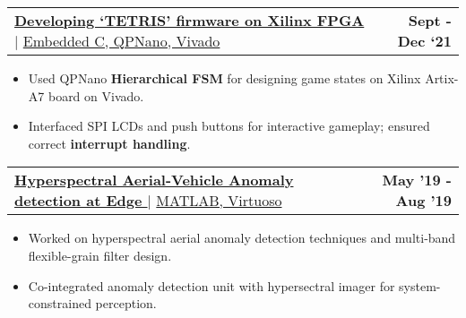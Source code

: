 \documentclass[letterpaper,11pt]{article}
\makeatletter
\newcommand{\resumeItem}[1]{
  \item\small{
    {#1 \vspace{-2pt}}
  }
}
\newcommand{\resumeProjectHeading}[2]{
    \item
    \begin{tabular*}{1\textwidth}{l@{\extracolsep{\fill}}r}
      \small#1 & \textbf{\small #2}\\
    \end{tabular*}\vspace{2pt}
}
\newcommand{\resumeItemListStart}{\begin{itemize}}
\newcommand{\resumeItemListEnd}{\end{itemize}\vspace{-5pt}}
\makeatother
\begin{document}
            


          
      \resumeProjectHeading
          {\href{https://github.com/umang-garg21/TETRIS-on-FPGA}{\textbf{\normalsize{Developing `TETRIS' firmware on Xilinx FPGA}} \href{https://github.com/UMANG-GARG-UCSB/TETRIS-on-FPGA}{\raisebox{-0.1\height}\faExternalLink }} $|$ {\underline{Embedded C, QPNano, Vivado}}}{Sept - Dec `21}
          \resumeItemListStart
               \vspace{-2pt}
            \resumeItem{\normalsize{Used QPNano \textbf{Hierarchical FSM} for designing game states on Xilinx Artix-A7 board on Vivado.}}
            
            \vspace{2pt}
            
            \resumeItem{\normalsize{Interfaced SPI LCDs and push buttons for interactive gameplay; ensured correct \textbf{interrupt handling}.}}

          \resumeItemListEnd 

    \vspace{-10pt}

          \resumeProjectHeading
          {\href{}{\textbf{\normalsize{Hyperspectral Aerial-Vehicle Anomaly detection at Edge }} \href{https://github.com/UMANG-GARG-UCSB/TETRIS-on-FPGA}{\raisebox{-0.1\height}\faExternalLink }} $|$ {\underline{MATLAB, Virtuoso}}}{May '19 - Aug '19}
          \resumeItemListStart
               \vspace{-2pt}
               
       \resumeItem{\normalsize{          Worked on hyperspectral aerial anomaly detection techniques and multi-band flexible-grain filter design.}}
  
        \vspace{2pt}
            
        \resumeItem{\normalsize{ Co-integrated anomaly detection unit with hypersectral imager for system-constrained perception. }}

          \resumeItemListEnd 

          
          
\end{document}
